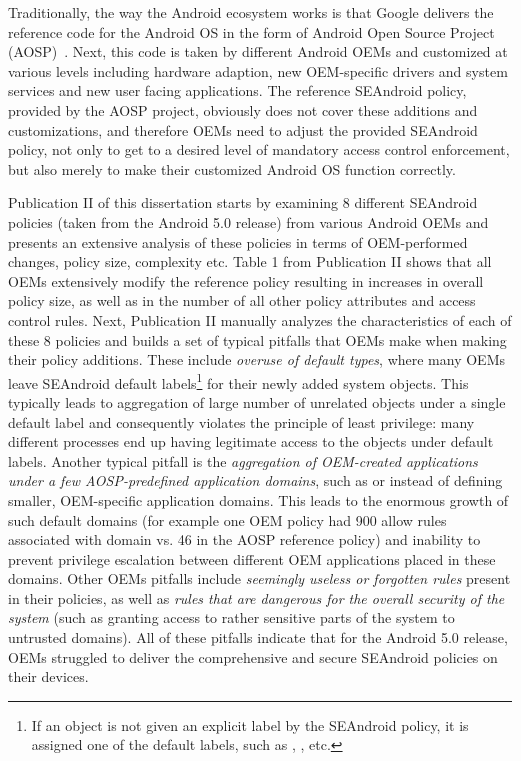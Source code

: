 Traditionally, the way the Android ecosystem works is that Google delivers the reference code for the Android OS in the form of Android Open Source Project (AOSP)~\cite{aosp}. Next, this code is taken by different Android OEMs and customized at various levels including hardware adaption, new OEM-specific drivers and system services and new user facing applications. The reference SEAndroid policy, provided by the AOSP project, obviously does not cover these additions and customizations, and therefore OEMs need to adjust the provided SEAndroid policy, not only to get to a desired level of mandatory access control enforcement, but also merely to make their customized Android OS function correctly.

Publication II of this dissertation starts by examining 8 different SEAndroid policies (taken from the Android 5.0 release) from various Android OEMs and presents an extensive analysis of these policies in terms of OEM-performed changes, policy size, complexity etc. Table 1 from Publication II shows that all OEMs extensively modify the reference policy resulting in increases in overall policy size, as well as in the number of all other policy attributes and access control rules. Next, Publication II manually analyzes the characteristics of each of these 8 policies and builds a set of typical pitfalls that OEMs make when making their policy additions. These include \textit{overuse of default types}, where many OEMs leave SEAndroid default labels\footnote{If an object is not given an explicit label by the SEAndroid policy, it is assigned one of the default labels, such as , ,  etc.} for their newly added system objects. This typically leads to aggregation of large number of unrelated objects under a single default label and consequently violates the principle of least privilege: many different processes end up having legitimate access to the objects under default labels. Another typical pitfall is the \textit{aggregation of OEM-created applications under a few AOSP-predefined application domains}, such as  or  instead of defining smaller, OEM-specific application domains. This leads to the enormous growth of such default domains (for example one OEM policy had 900 allow rules associated with  domain vs. 46 in the AOSP reference policy) and inability to prevent privilege escalation between different OEM applications placed in these domains. Other OEMs pitfalls include \textit{seemingly useless or forgotten rules} present in their policies, as well as \textit{rules that are dangerous for the overall security of the system} (such as granting access to rather sensitive parts of the system to untrusted domains). All of these pitfalls indicate that for the Android 5.0 release, OEMs struggled to deliver the comprehensive and secure SEAndroid policies on their devices. 


